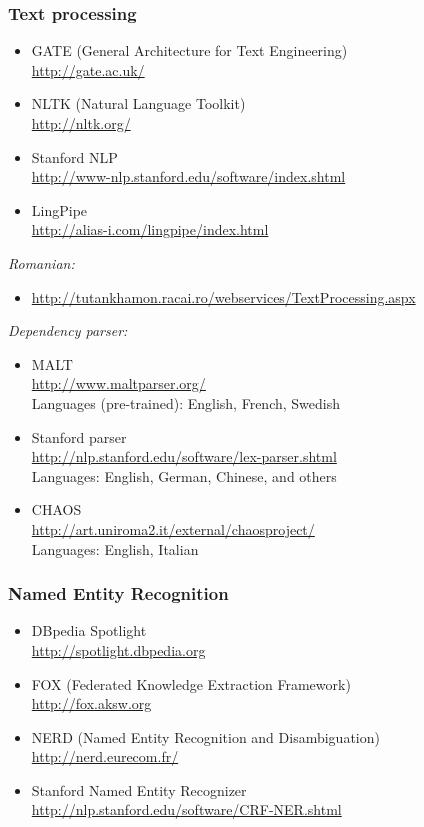 \subsubsection*{Text processing}

\begin{itemize}
\item GATE (General Architecture for Text Engineering) \\
      \url{http://gate.ac.uk/}
\item NLTK (Natural Language Toolkit) \\
      \url{http://nltk.org/}
\item Stanford NLP \\
      \url{http://www-nlp.stanford.edu/software/index.shtml}
\item LingPipe \\
      \url{http://alias-i.com/lingpipe/index.html}
\end{itemize}

\emph{Romanian:}
\begin{itemize}
\item
\url{http://tutankhamon.racai.ro/webservices/TextProcessing.aspx}
\end{itemize}

\emph{Dependency parser:}

\begin{itemize}
\item MALT \\
      \url{http://www.maltparser.org/} \\
      Languages (pre-trained): English, French, Swedish
\item Stanford parser \\
      \url{http://nlp.stanford.edu/software/lex-parser.shtml} \\
      Languages: English, German, Chinese, and others
\item CHAOS \\
      \url{http://art.uniroma2.it/external/chaosproject/} \\
      Languages: English, Italian
\end{itemize}

\subsubsection*{Named Entity Recognition}

\begin{itemize}
\item DBpedia Spotlight \\
      \url{http://spotlight.dbpedia.org}
\item FOX (Federated Knowledge Extraction Framework) \\
      \url{http://fox.aksw.org}
\item NERD (Named Entity Recognition and Disambiguation) \\
      \url{http://nerd.eurecom.fr/}
\item Stanford Named Entity Recognizer \\
      \url{http://nlp.stanford.edu/software/CRF-NER.shtml}
\end{itemize}

